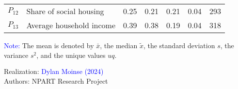 \begin{table}[h!]
{\begin{tabular}{p{}p{}p{}p{}p{}p{}p{}}
\small{\(P_{12}\)} & \small{Share of social housing} & \small{0.25} & \small{0.21} & \small{0.21} & \small{0.04} & \small{293}\\
\small{\(P_{13}\)} & \small{Average household income} & \small{0.39} & \small{0.38} & \small{0.19} & \small{0.04} & \small{318}\\
        \hline
    \end{tabular}}
    \caption*{}
    \vspace{5pt}
        \begin{flushleft}\scriptsize{
        \textcolor{blue}{Note:} The mean is denoted by \(\bar{x}\), the median \(\tilde{x}\), the standard deviation \(s\), the variance \(s^2\), and the unique values \(uq\).
        }\end{flushleft}
        \begin{flushright}\scriptsize
        Realization: \textcolor{blue}{Dylan Moinse (2024)}
        \\
        Authors: \acrshort{NPART} Research Project
        \end{flushright}
        \end{table}